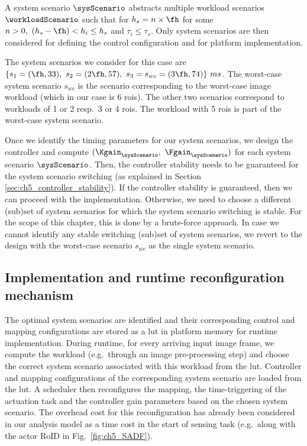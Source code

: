 A system scenario $\sysScenario$ abstracts multiple workload scenarios $\workloadScenario$ such that for $h_s=n\times \fh$ for some $n>0,\ (h_s-\fh) < h_i \leq h_s$ and $\tau_i \leq \tau_s$.
Only system scenarios are then considered for defining the control configuration and for platform implementation.

The system scenarios we consider for this case are $\{s_1=(\fh,33),\ s_2=(2\fh,57),\ s_3=s_{wc}=(3\fh,74)\}\ ms$.
The worst-case system scenario $s_{wc}$ is the scenario corresponding to the worst-case image workload (which in our case is 6 \glspl{roi}). The other two scenarios correspond to workloads of 1 or 2 resp.\ 3 or 4 \glspl{roi}. The workload with 5 \glspl{roi} is part of the worst-case system scenario.

Once we identify the timing parameters for our system scenarios, we design the controller and compute $(\Kgain_{\sysScenario},\ \Fgain_{\sysScenario})$ for each system scenario $\sysScenario$.
Then, the controller stability needs to be guaranteed for the system scenario switching (as explained in Section \ref{sec:ch5_controller_stability}). If the controller stability is guaranteed, then we can proceed with the implementation. Otherwise, we need to choose a different (sub)set of system scenarios for which the system scenario switching is stable. For the scope of this chapter, this is done by a brute-force approach. In case we cannot identify any stable switching (sub)set of system scenarios, we revert to the design with the worst-case scenario $s_{wc}$ as the single system scenario.

\subsection{Implementation and runtime reconfiguration mechanism}
The optimal system scenarios are identified and their corresponding control and mapping configurations are stored as a \gls{lut} in platform memory for runtime implementation.
During runtime, for every arriving input image frame, we compute the workload (e.g.\ through an image pre-processing step) and choose the correct system scenario associated with this workload from the \gls{lut}. 
Controller and mapping configurations of the corresponding system scenario are loaded from the \gls{lut}. A scheduler then reconfigures the mapping, the time-triggering of the actuation task and the controller gain parameters based on the chosen system scenario. The overhead cost for this reconfiguration has already been considered in our
analysis model as a time cost in the start of sensing task (e.g.\ along with the actor RoID in Fig.~\ref{fig:ch5_SADF}).

